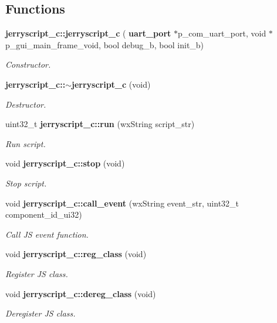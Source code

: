 \subsection*{Functions}
\begin{DoxyCompactItemize}
\item 
\textbf{ jerryscript\+\_\+c\+::jerryscript\+\_\+c} (\textbf{ uart\+\_\+port} $\ast$p\+\_\+com\+\_\+uart\+\_\+port, void $\ast$p\+\_\+gui\+\_\+main\+\_\+frame\+\_\+void, bool debug\+\_\+b, bool init\+\_\+b)
\begin{DoxyCompactList}\small\item\em Constructor. \end{DoxyCompactList}\item 
\textbf{ jerryscript\+\_\+c\+::$\sim$jerryscript\+\_\+c} (void)
\begin{DoxyCompactList}\small\item\em Destructor. \end{DoxyCompactList}\item 
uint32\+\_\+t \textbf{ jerryscript\+\_\+c\+::run} (wx\+String script\+\_\+str)
\begin{DoxyCompactList}\small\item\em Run script. \end{DoxyCompactList}\item 
void \textbf{ jerryscript\+\_\+c\+::stop} (void)
\begin{DoxyCompactList}\small\item\em Stop script. \end{DoxyCompactList}\item 
void \textbf{ jerryscript\+\_\+c\+::call\+\_\+event} (wx\+String event\+\_\+str, uint32\+\_\+t component\+\_\+id\+\_\+ui32)
\begin{DoxyCompactList}\small\item\em Call JS event function. \end{DoxyCompactList}\item 
void \textbf{ jerryscript\+\_\+c\+::reg\+\_\+class} (void)
\begin{DoxyCompactList}\small\item\em Register JS class. \end{DoxyCompactList}\item 
void \textbf{ jerryscript\+\_\+c\+::dereg\+\_\+class} (void)
\begin{DoxyCompactList}\small\item\em Deregister JS class. \end{DoxyCompactList}\end{DoxyCompactItemize}
